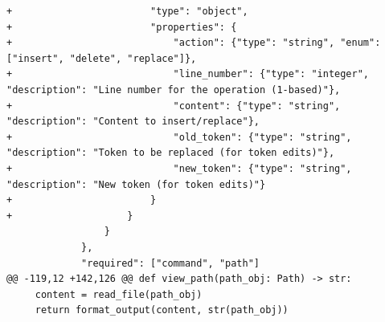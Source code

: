 \documentclass{article}
\begin{document}
\begin{lstlisting}[style=diffstyle]
+                        "type": "object",
+                        "properties": {
+                            "action": {"type": "string", "enum": ["insert", "delete", "replace"]},
+                            "line_number": {"type": "integer", "description": "Line number for the operation (1-based)"},
+                            "content": {"type": "string", "description": "Content to insert/replace"},
+                            "old_token": {"type": "string", "description": "Token to be replaced (for token edits)"},
+                            "new_token": {"type": "string", "description": "New token (for token edits)"}
+                        }
+                    }
                 }
             },
             "required": ["command", "path"]
@@ -119,12 +142,126 @@ def view_path(path_obj: Path) -> str:
     content = read_file(path_obj)
     return format_output(content, str(path_obj))
 

\end{lstlisting}
\end{document}
